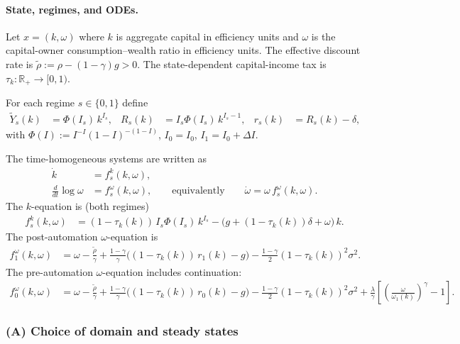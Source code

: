 \documentclass{article}
\begin{document}
\paragraph{State, regimes, and ODEs.}
Let $x=(k,\omega)$ where $k$ is aggregate capital in efficiency units and $\omega$ is the
capital-owner consumption--wealth ratio in efficiency units. The effective discount rate
is $\tilde\rho := \rho-(1-\gamma)g>0$. The state-dependent capital-income tax is
$\tau_k:\mathbb{R}_+\to[0,1)$.

For each regime $s\in\{0,1\}$ define
\begin{align}
\tilde Y_s(k) &= \Phi(I_s)\,k^{I_s},&
R_s(k) &= I_s\Phi(I_s)\,k^{I_s-1},&
r_s(k) &= R_s(k)-\delta,
\end{align}
with $\Phi(I):=I^{-I}(1-I)^{-(1-I)}$, $I_0=I_0$, $I_1=I_0+\Delta I$.

The time-homogeneous systems are written as
\begin{align}
\dot k &= f^k_s(k,\omega), \label{eq:ode_k_general}\\
\frac{d}{dt}\log\omega &= f^\omega_s(k,\omega), \qquad\text{equivalently}\qquad \dot\omega=\omega\,f^\omega_s(k,\omega). \label{eq:ode_omega_general}
\end{align}
The $k$-equation is (both regimes)
\begin{align}
f^k_s(k,\omega)
&=(1-\tau_k(k))\,I_s\Phi(I_s)\,k^{I_s}
-\Big(g+(1-\tau_k(k))\delta+\omega\Big)\,k. \label{eq:fks_general}
\end{align}
The post-automation $\omega$-equation is
\begin{align}
f^\omega_1(k,\omega)
&= \omega-\frac{\tilde\rho}{\gamma}
+\frac{1-\gamma}{\gamma}\Big((1-\tau_k(k))\,r_1(k)-g\Big)
-\frac{1-\gamma}{2}(1-\tau_k(k))^2\sigma^2. \label{eq:fw1_general}
\end{align}
The pre-automation $\omega$-equation includes continuation:
\begin{align}
f^\omega_0(k,\omega)
&= \omega-\frac{\tilde\rho}{\gamma}
+\frac{1-\gamma}{\gamma}\Big((1-\tau_k(k))\,r_0(k)-g\Big)
-\frac{1-\gamma}{2}(1-\tau_k(k))^2\sigma^2
+\frac{\lambda}{\gamma}\left[\left(\frac{\omega}{\omega_1(k)}\right)^\gamma-1\right]. \label{eq:fw0_general}
\end{align}

\subsubsection{(A) Choice of domain and steady states}\label{sec:numerics_domain}
\end{document}
